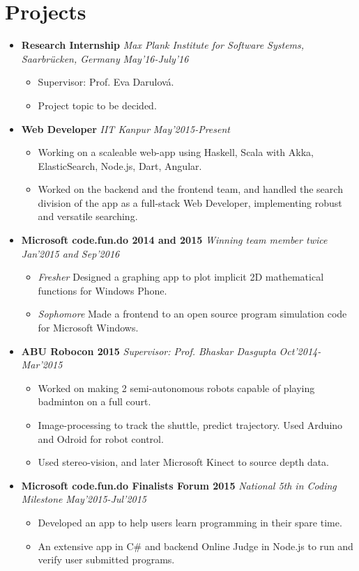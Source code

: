\documentclass[11pt,a4paper]{moderncv}
\newcommand{\experience}[4]{
  \vspace{0.1cm}
\item \textbf{\large{#1}} \emph{#2} \hfill \textit{#3}
  \begin{itemize}[leftmargin=*]
    \setlength\itemsep{0em} #4
  \end{itemize}
}
\newcommand{\onepage}[1]{
  \ifdefined\onep
  #1
  \fi
}
\newcommand{\twopage}[1]{
  \ifdefined\twop
  #1
  \fi
}
\newcommand{\secspace}{
  \onepage{\vspace{-0.27cm}}
  \twopage{\vspace{-0.07cm}}
}
\newcommand{\secbelow}{
  \onepage{\vspace{-0.07cm}}
}
\begin{document}
\secspace
\section*{Projects}
\secbelow
\begin{itemize}
  \twopage{\setlength\itemsep{0.5em}}
  \experience{Research Internship}{Max Plank Institute for Software
    Systems, Saarbrücken, Germany}{May'16-July'16}{
  \item Supervisor: Prof. Eva Darulová.
  \item Project topic to be decided.
  }

  \experience{Web Developer}{IIT Kanpur}{May'2015-Present}{
  \item Working on a scaleable web-app using Haskell, Scala with Akka, ElasticSearch, Node.js, Dart, Angular.
  \item Worked on the backend and the frontend team, and handled the
    search division of the app as a full-stack Web
    Developer, implementing robust and versatile searching. 
  }

  \experience{Microsoft code.fun.do 2014 and 2015}{Winning team member twice}{Jan'2015 and Sep'2016}{
  \item \textit{Fresher} Designed a graphing app to plot implicit 2D mathematical functions for Windows Phone.
  \item \textit{Sophomore} Made a frontend to an open source program simulation code for Microsoft Windows.
  }

  \experience{ABU Robocon 2015}{Supervisor: Prof. Bhaskar Dasgupta}{Oct'2014-Mar'2015}{
  \item Worked on making 2 semi-autonomous robots capable of playing badminton on a full court.
  \item Image-processing to track the shuttle, predict trajectory. Used Arduino and Odroid for robot control.
  \item Used stereo-vision, and later Microsoft Kinect to source depth data.
  }

  \experience{Microsoft code.fun.do Finalists Forum 2015}{National 5th in Coding Milestone}{May'2015-Jul'2015}{
  \item Developed an app to help users learn programming in their spare time.
  \item An extensive app in C\# and backend Online Judge in Node.js to run and verify user submitted programs.
  }
\end{itemize}

\secspace
\end{document}
